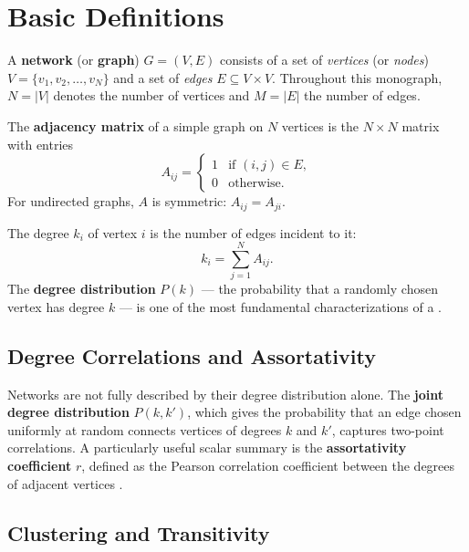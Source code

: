 \section{Basic Definitions}

A \textbf{network} (or \textbf{graph}) $G = (V, E)$ consists of a set of \textit{vertices} (or \textit{nodes}) $V = \{v_1, v_2, \dots, v_N\}$ and a set of \textit{edges} $E \subseteq V \times V$. Throughout this monograph, $N = |V|$ denotes the number of vertices and $M = |E|$ the number of edges.

\begin{definition}\label{def:adjacency}
The \textbf{adjacency matrix} of a simple graph on $N$ vertices is the $N \times N$ matrix with entries
\[
A_{ij} = 
\begin{cases}
1 & \text{if } (i,j) \in E,\\[2pt]
0 & \text{otherwise}.
\end{cases}
\]
For undirected graphs, $A$ is symmetric: $A_{ij} = A_{ji}$.
\end{definition}

The degree $k_i$ of vertex $i$ is the number of edges incident to it:
\[
k_i = \sum_{j=1}^{N} A_{ij}.
\]
The \textbf{degree distribution} $P(k)$ --- the probability that a randomly chosen vertex has degree $k$ --- is one of the most fundamental characterizations of a .

\subsection{Degree Correlations and Assortativity}

Networks are not fully described by their degree distribution alone. The \textbf{joint degree distribution} $P(k, k')$, which gives the probability that an edge chosen uniformly at random connects vertices of degrees $k$ and $k'$, captures two-point correlations. A particularly useful scalar summary is the \textbf{assortativity coefficient} $r$, defined as the Pearson correlation coefficient between the degrees of adjacent vertices .

\subsection{Clustering and Transitivity}

